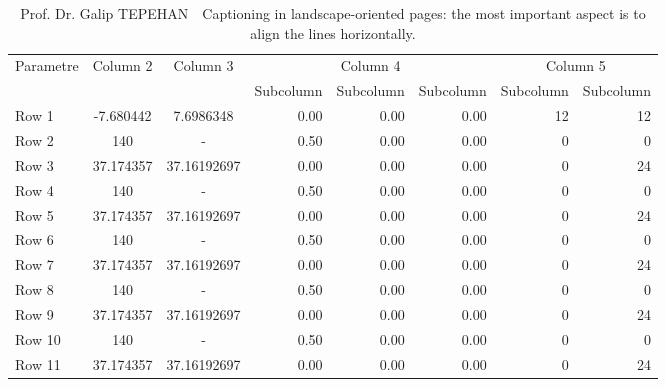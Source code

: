 \begin{landscape}
	\thispagestyle{empty}
	\begin{table}[htb!]
		{\setlength{\tabcolsep}{14pt}
			\caption{Prof. Dr. Galip TEPEHAN \,\, Captioning in landscape-oriented pages:
				the most important aspect is to align the lines horizontally.}
			\begin{center}
				\vspace{-6mm}
				\begin{tabular}{lccrrrrr}
					\hline\hline
					\multirow{2}{*}{Parametre} & \multirow{2}{*}{Column 2} & \multirow{2}{*}{Column 3} & \multicolumn{3}{c|}{Column 4} & \multicolumn{2}{c}{Column 5}\\ \cline{4-8}
					& & & Subcolumn & Subcolumn & Subcolumn & Subcolumn & Subcolumn\\
					\hline
					Row 1 & -7.680442 & 7.6986348 & 0.00 & 0.00 & 0.00 & 12 & 12 \\
					Row 2 & 140 & - & 0.50 & 0.00 & 0.00 & 0 & 0 \\
					Row 3 & 37.174357 & 37.16192697 & 0.00 & 0.00 & 0.00 & 0 & 24 \\
					Row 4 & 140 & - & 0.50 & 0.00 & 0.00 & 0 & 0 \\
					Row 5 & 37.174357 & 37.16192697 & 0.00 & 0.00 & 0.00 & 0 & 24 \\
					Row 6 & 140 & - & 0.50 & 0.00 & 0.00 & 0 & 0 \\
					Row 7 & 37.174357 & 37.16192697 & 0.00 & 0.00 & 0.00 & 0 & 24 \\
					Row 8 & 140 & - & 0.50 & 0.00 & 0.00 & 0 & 0 \\
					Row 9 & 37.174357 & 37.16192697 & 0.00 & 0.00 & 0.00 & 0 & 24 \\
					Row 10 & 140 & - & 0.50 & 0.00 & 0.00 & 0 & 0 \\
					Row 11 & 37.174357 & 37.16192697 & 0.00 & 0.00 & 0.00 & 0 & 24 \\

\end{tabular}
\end{center}}
\end{table}
\end{landscape}
